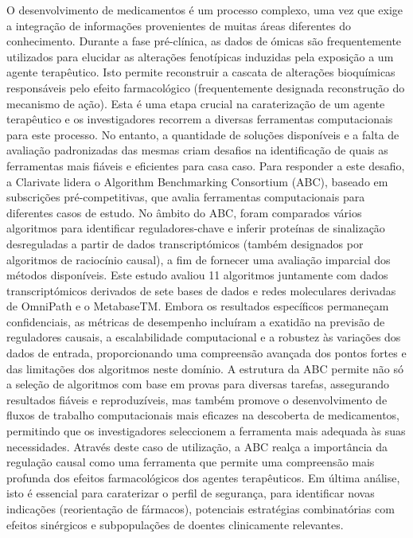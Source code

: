 ﻿%

%

O desenvolvimento de medicamentos é um processo complexo, uma vez que exige a integração de informações provenientes de muitas áreas diferentes do conhecimento. Durante a fase pré-clínica, as dados de ómicas são frequentemente utilizados para elucidar as alterações fenotípicas induzidas pela exposição a um agente terapêutico. Isto permite reconstruir a cascata de alterações bioquímicas responsáveis pelo efeito farmacológico (frequentemente designada reconstrução do mecanismo de ação). Esta é uma etapa crucial na caraterização de um agente terapêutico e os investigadores recorrem a diversas ferramentas computacionais para este processo. No entanto, a quantidade de soluções disponíveis e a falta de avaliação padronizadas das mesmas criam desafios na identificação de quais as ferramentas mais fiáveis e eficientes para casa caso. Para responder a este desafio, a Clarivate lidera o Algorithm Benchmarking Consortium (ABC), baseado em subscrições pré-competitivas, que avalia ferramentas computacionais para diferentes casos de estudo. No âmbito do ABC, foram comparados vários algoritmos para identificar reguladores-chave e inferir proteínas de sinalização desreguladas a partir de dados transcriptómicos (também designados por algoritmos de raciocínio causal), a fim de fornecer uma avaliação imparcial dos métodos disponíveis. Este estudo avaliou 11 algoritmos juntamente com dados transcriptómicos derivados de sete bases de dados e redes moleculares derivadas de OmniPath e o MetabaseTM. Embora os resultados específicos permaneçam confidenciais, as métricas de desempenho incluíram a exatidão na previsão de reguladores causais, a escalabilidade computacional e a robustez às variações dos dados de entrada, proporcionando uma compreensão avançada dos pontos fortes e das limitações dos algoritmos neste domínio. A estrutura da ABC permite não só a seleção de algoritmos com base em provas para diversas tarefas, assegurando resultados fiáveis e reproduzíveis, mas também promove o desenvolvimento de fluxos de trabalho computacionais mais eficazes na descoberta de medicamentos, permitindo que os investigadores seleccionem a ferramenta mais adequada às suas necessidades. Através deste caso de utilização, a ABC realça a importância da regulação causal como uma ferramenta que permite uma compreensão mais profunda dos efeitos farmacológicos dos agentes terapêuticos. Em última análise, isto é essencial para caraterizar o perfil de segurança, para identificar novas indicações (reorientação de fármacos), potenciais estratégias combinatórias com efeitos sinérgicos e subpopulações de doentes clinicamente relevantes.


